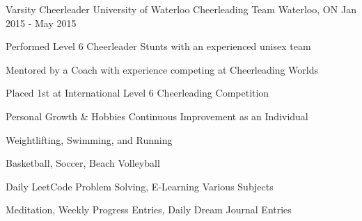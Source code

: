 

\begin{cventries}

  \cventry
    {Varsity Cheerleader} %
    {University of Waterloo Cheerleading Team} %
    {Waterloo, ON} %
    {Jan 2015 - May 2015} %
    {
      \begin{cvitems} %
        \item Performed Level 6 Cheerleader Stunts with an experienced unisex team
        \item Mentored by a Coach with experience competing at Cheerleading Worlds
        \item Placed 1st at International Level 6 Cheerleading Competition
      \end{cvitems}
    }

  \cventry
    {Personal Growth \& Hobbies} %
    {Continuous Improvement as an Individual} %
    {} %
    {} %
    {
      \begin{cvitems} %
        \item Weightlifting, Swimming, and Running
        \item Basketball, Soccer, Beach Volleyball
        \item Daily LeetCode Problem Solving, E-Learning Various Subjects
        \item Meditation, Weekly Progress Entries, Daily Dream Journal Entries 
      \end{cvitems}
    }

\end{cventries}
